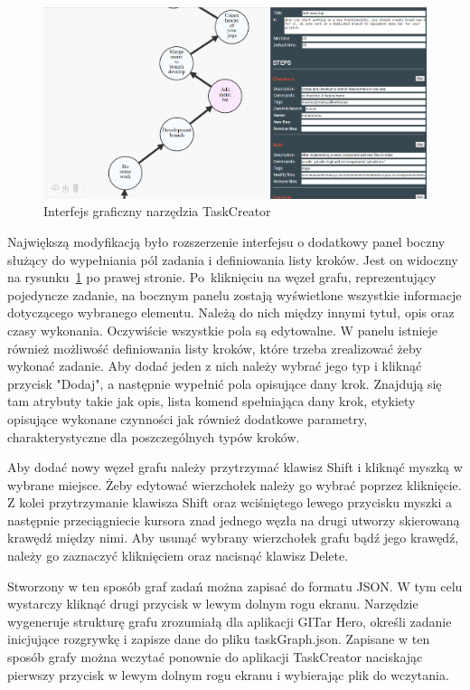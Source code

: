 \documentclass[11pt,a4paper,polish,thesis]{dcsbook}
\begin{document}
	\begin{figure}
		\centering
		\includegraphics[width=12cm]{graphCreator01}
		\caption{Interfejs graficzny narzędzia TaskCreator}
		\label{fig:taskCreator}
	\end{figure}
	
	Największą modyfikacją było rozszerzenie interfejsu o dodatkowy panel boczny służący do wypełniania pól zadania i definiowania listy kroków. Jest on widoczny na rysunku~\ref{fig:taskCreator} po prawej stronie. Po~kliknięciu na węzeł grafu, reprezentujący pojedyncze zadanie, na bocznym panelu zostają wyświetlone wszystkie informacje dotyczącego wybranego elementu. Należą do nich między innymi tytuł, opis oraz czasy wykonania. Oczywiście wszystkie pola są edytowalne. W panelu istnieje również możliwość definiowania listy kroków, które trzeba zrealizować żeby wykonać zadanie. Aby dodać jeden z nich należy wybrać jego typ i kliknąć przycisk "Dodaj", a następnie wypełnić pola opisujące dany krok. Znajdują się tam atrybuty takie jak opis, lista komend spełniająca dany krok, etykiety opisujące wykonane czynności jak również dodatkowe parametry, charakterystyczne dla poszczególnych typów kroków. 
	
	Aby dodać nowy węzeł grafu należy przytrzymać klawisz Shift i kliknąć myszką w wybrane miejsce. Żeby edytować wierzchołek należy go wybrać poprzez kliknięcie. Z kolei przytrzymanie klawisza Shift oraz wciśniętego lewego przycisku myszki a następnie przeciągniecie kursora znad jednego węzła na drugi utworzy skierowaną krawędź między nimi. Aby usunąć wybrany wierzchołek grafu bądź jego krawędź, należy go zaznaczyć kliknięciem oraz nacisnąć klawisz Delete. 
	
	Stworzony w ten sposób graf zadań można zapisać do formatu JSON. W tym celu wystarczy kliknąć drugi przycisk w lewym dolnym rogu ekranu. Narzędzie wygeneruje strukturę grafu zrozumiałą dla aplikacji GITar Hero, określi zadanie inicjujące rozgrywkę i zapisze dane do pliku taskGraph.json. Zapisane w ten sposób grafy można wczytać ponownie do aplikacji TaskCreator naciskając pierwszy przycisk w lewym dolnym rogu ekranu i wybierając plik do wczytania.
	
\end{document}
